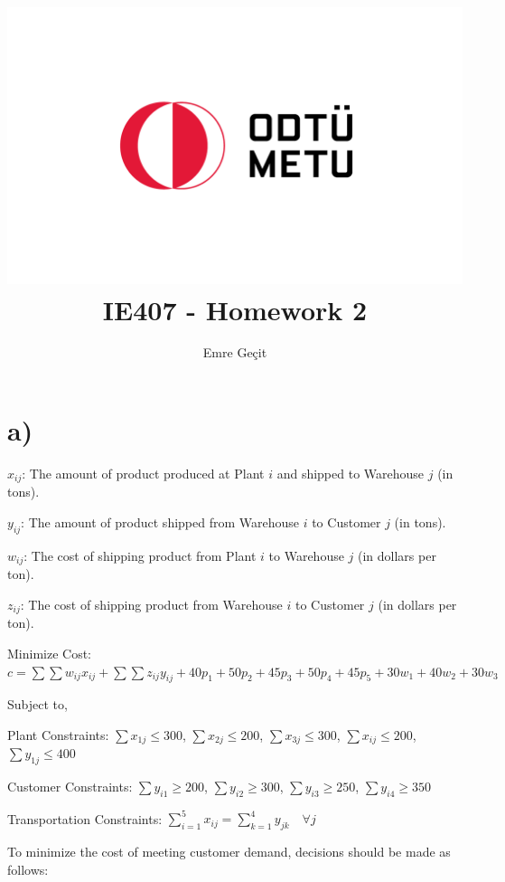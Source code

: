 \documentclass{article}
\author{Emre Geçit}
\title{\includegraphics{9.4.png}\\ IE407 - Homework 2}
\begin{document}
\maketitle

\newpage

\section*{a)}

$x_{ij}$: The amount of product produced at Plant $i$ and shipped to Warehouse $j$ (in tons).

$y_{ij}$: The amount of product shipped from Warehouse $i$ to Customer $j$ (in tons).

$w_{ij}$: The cost of shipping product from Plant $i$ to Warehouse $j$ (in dollars per ton).

$z_{ij}$: The cost of shipping product from Warehouse $i$ to Customer $j$ (in dollars per ton).

Minimize Cost: $c = \sum \sum w_{ij} x_{ij} + \sum \sum z_{ij} y_{ij} + 40p_1 + 50p_2 + 45p_3 + 50p_4 + 45p_5 + 30w_1 + 40w_2 + 30w_3$

Subject to,

Plant Constraints: $\sum{x_{1j}} \leq 300$, $\sum{x_{2j}} \leq 200$, $\sum{x_{3j}} \leq 300$, $\sum{x_{ij}} \leq 200$, $\sum{y_{1j}} \leq 400$

Customer Constraints: $\sum{y_{i1}} \geq 200$, $\sum{y_{i2}} \geq 300$, $\sum{y_{i3}} \geq 250$, $\sum{y_{i4}} \geq 350$

Transportation Constraints: $\sum_{i=1}^5 {x_{ij}} = \sum_{k=1}^4 {y_{jk}} \quad \forall j$

To minimize the cost of meeting customer demand, decisions should be made as follows:
\end{document}
